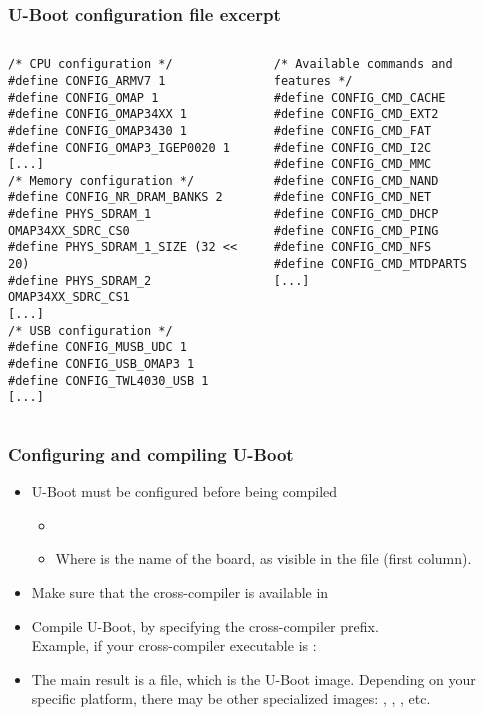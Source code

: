 \begin{frame}[fragile]
  \frametitle{U-Boot configuration file excerpt}
  \begin{columns}
    \scriptsize
\begin{verbatim}
/* CPU configuration */
#define CONFIG_ARMV7 1
#define CONFIG_OMAP 1
#define CONFIG_OMAP34XX 1
#define CONFIG_OMAP3430 1
#define CONFIG_OMAP3_IGEP0020 1
[...]
/* Memory configuration */
#define CONFIG_NR_DRAM_BANKS 2
#define PHYS_SDRAM_1 OMAP34XX_SDRC_CS0
#define PHYS_SDRAM_1_SIZE (32 <<  20)
#define PHYS_SDRAM_2 OMAP34XX_SDRC_CS1
[...]
/* USB configuration */
#define CONFIG_MUSB_UDC 1
#define CONFIG_USB_OMAP3 1
#define CONFIG_TWL4030_USB 1
[...]
\end{verbatim}
    \scriptsize
\begin{verbatim}
/* Available commands and features */
#define CONFIG_CMD_CACHE
#define CONFIG_CMD_EXT2
#define CONFIG_CMD_FAT
#define CONFIG_CMD_I2C
#define CONFIG_CMD_MMC
#define CONFIG_CMD_NAND
#define CONFIG_CMD_NET
#define CONFIG_CMD_DHCP
#define CONFIG_CMD_PING
#define CONFIG_CMD_NFS
#define CONFIG_CMD_MTDPARTS
[...]
\end{verbatim}
  \end{columns}
\end{frame}

\begin{frame}
  \frametitle{Configuring and compiling U-Boot}
  \begin{itemize}
  \item U-Boot must be configured before being compiled
    \begin{itemize}
    \item {}
    \item Where  is the name of the board, as visible
      in the  file (first column).
    \end{itemize}
  \item Make sure that the cross-compiler is available in 
  \item Compile U-Boot, by specifying the cross-compiler prefix.\\
    Example, if your cross-compiler executable is :\\
  \item The main result is a  file, which is the
    U-Boot image. Depending on your specific platform, there may be
    other specialized images: , ,
    , etc.
  \end{itemize}
\end{frame}

